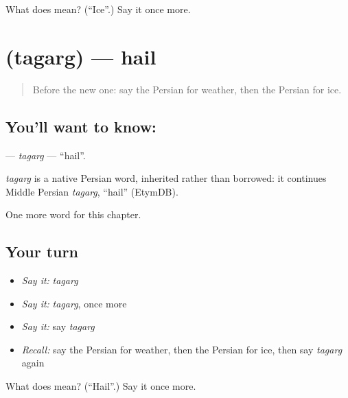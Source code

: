 \begin{tcolorbox}[breakable,colback=teal!4,colframe=teal!35!black,title={Before you move on}]
What does  mean? (\textquotedblleft{}Ice\textquotedblright{}.) Say it once more.
\end{tcolorbox}
\section[\texorpdfstring{\fa{تگرگ} (tagarg)}{تگرگ (tagarg)}]{ (tagarg) — hail}

\label{lesson:FA-C208-tagarg}



\begin{quote}
Before the new one: say the Persian for weather, then the Persian for ice.
\end{quote}

\subsection*{You'll want to know: }
\textbf{} — \emph{tagarg} — \textquotedblleft{}hail\textquotedblright{}.

\begin{cousinweb}
\emph{tagarg} is a native Persian word, inherited rather than borrowed: it continues Middle Persian \emph{tagarg}, \textquotedblleft{}hail\textquotedblright{} (EtymDB).
\end{cousinweb}

\begin{grammarlens}[title={What you've built}]
One more word for this chapter.
\end{grammarlens}

\subsection*{Your turn}
\begin{itemize}
\raggedright
  \item \emph{Say it:} \emph{tagarg}
  \item \emph{Say it:} \emph{tagarg}, once more
  \item \emph{Say it:} say \emph{tagarg}
  \item \emph{Recall:} say the Persian for weather, then the Persian for ice, then say \emph{tagarg} again
\end{itemize}

\begin{tcolorbox}[breakable,colback=teal!4,colframe=teal!35!black,title={Before you move on}]
What does  mean? (\textquotedblleft{}Hail\textquotedblright{}.) Say it once more.
\end{tcolorbox}
